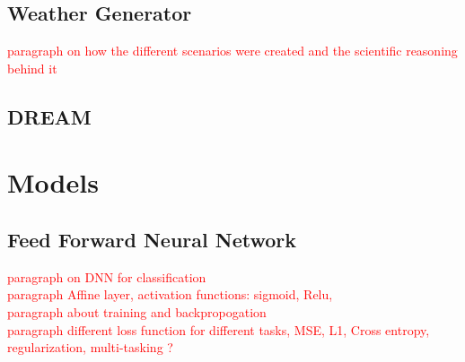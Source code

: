 \documentclass[12pt]{report}
\begin{document}
\subsection{Weather Generator}


\textcolor{red}{paragraph on how the different scenarios were created and the scientific reasoning behind it}
\subsection{DREAM}

\newpage
\section{Models}
\subsection{Feed Forward Neural Network}
\textcolor{red}{paragraph on DNN for classification}\\

\textcolor{red}{paragraph Affine layer, activation functions:  sigmoid, Relu, }\\

\textcolor{red}{paragraph about training and backpropogation}\\

\textcolor{red}{paragraph different loss function for different tasks, MSE, L1, Cross entropy, regularization, multi-tasking ?}\\





\end{document}
